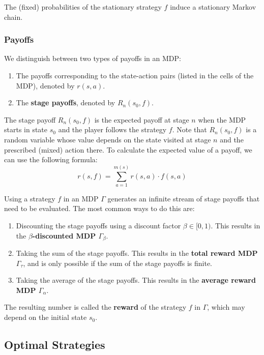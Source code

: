 \documentclass[12pt]{article}
\begin{document}
\noindent
The (fixed) probabilities of the stationary strategy $f$ induce a stationary Markov chain.

\newpage
\subsubsection{Payoffs}
We distinguish between two types of payoffs in an MDP:

\begin{enumerate}
    \item The payoffs corresponding to the state-action pairs (listed in the cells of the MDP), denoted by $r(s, a)$.
    \item The \textbf{stage payoffs}, denoted by $R_n(s_0, f)$.
\end{enumerate}

\noindent
The stage payoff $R_n(s_0, f)$ is the expected payoff at stage $n$ when the MDP starts in state $s_0$ and the player follows the strategy $f$.
Note that $R_n(s_0, f)$ is a random variable whose value depends on the state visited at stage $n$ and the prescribed (mixed) action there.
To calculate the expected value of a payoff, we can use the following formula:
\[ r(s, f) = \sum_{a = 1}^{m(s)} r(s, a) \cdot f(s, a) \]

\noindent
Using a strategy $f$ in an MDP $\Gamma$ generates an infinite stream of stage payoffs that need to be evaluated.
The most common ways to do this are:

\begin{enumerate}
    \item Discounting the stage payoffs using a discount factor $\beta \in [0, 1)$. This results in the \textbf{$\beta$-discounted MDP $\Gamma_\beta$}.
    \item Taking the sum of the stage payoffs. This results in the \textbf{total reward MDP $\Gamma_\tau$}, and is only possible if the sum of the stage payoffs is finite.
    \item Taking the average of the stage payoffs. This results in the \textbf{average reward MDP $\Gamma_\alpha$}. 
\end{enumerate}

\noindent
The resulting number is called the \textbf{reward} of the strategy $f$ in $\Gamma$, which may depend on the initial state $s_0$.

\subsection{Optimal Strategies}
\end{document}
